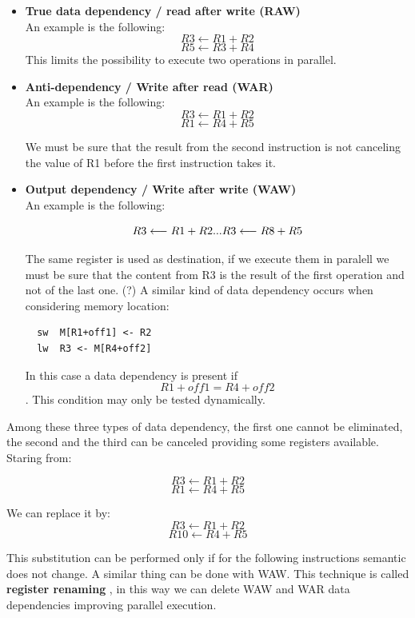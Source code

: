\begin{itemize}

  \item \textbf{True data dependency / read after write (RAW)}\\
  An example is the following:
  $$R3 \longleftarrow R1+ R2$$
  $$R5 \longleftarrow R3+ R4$$
  This limits the possibility to execute two operations in parallel.

  \item \textbf{Anti-dependency / Write after read (WAR)}\\
  An example is the following:
  $$R3 \longleftarrow R1+ R2$$
  $$R1 \longleftarrow R4+ R5$$

  We must be sure that the result from the second instruction is not canceling the value of R1 before the first instruction takes it.

  \item \textbf{Output dependency / Write after write (WAW)}\\
  An example is the following:

  $$R3 \longleftarrow R1+ R2\\
  ...\\
  R3 \longleftarrow R8+ R5$$

  The same register is used as destination, if we execute them in paralell we must be sure that the content from R3 is the result of the first operation and not of the last one. (?)
  A similar kind of data dependency occurs when considering memory location:
  \begin{verbatim}
  sw  M[R1+off1] <- R2
  lw  R3 <- M[R4+off2]
  \end{verbatim}

  In this case a data dependency is present if $$R1+off1=R4+off2$$. This condition may only be tested dynamically.

\end{itemize}

Among these three types of data dependency, the first one cannot be eliminated, the second and the third can be canceled providing some registers available. Staring from:

$$  R3 \longleftarrow R1+ R2$$
$$  R1 \longleftarrow R4+ R5$$

We can replace it by:
$$R3 \longleftarrow R1+ R2$$
$$R10 \longleftarrow R4+ R5$$

This substitution can be performed only if for the following instructions semantic does not change. A similar thing can be done with WAW. This technique is called \textbf{register renaming} , in this way we can delete WAW and WAR data dependencies improving parallel execution.


